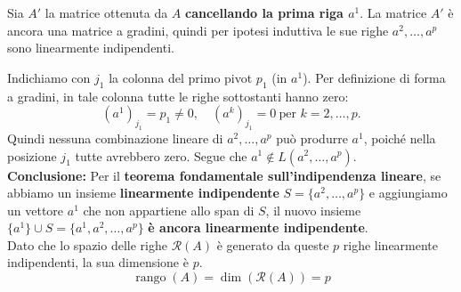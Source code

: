 {{\begin{itemize}
            Sia \(A'\) la matrice ottenuta da \(A\) \textbf{cancellando la prima riga \(a^1\)}.
            La matrice \(A'\) è ancora una matrice a gradini, quindi per ipotesi induttiva le sue righe 
            \(a^2, \dots, a^p\) sono linearmente indipendenti.
            
            Indichiamo con \(j_1\) la colonna del primo pivot \(p_1\) (in \(a^1\)).  
            Per definizione di forma a gradini, in tale colonna tutte le righe sottostanti hanno zero:
            \[
                (a^1)_{j_1} = p_1 \neq 0, 
                \quad (a^k)_{j_1} = 0 \ \text{per } k = 2, \dots, p.
            \]
            Quindi nessuna combinazione lineare di \(a^2, \dots, a^p\) può produrre \(a^1\), 
            poiché nella posizione \(j_1\) tutte avrebbero zero.  
            Segue che \(a^1 \notin L(a^2, \dots, a^p)\).\\[6pt]
            
            \textbf{Conclusione:}
            Per il \textbf{teorema fondamentale sull'indipendenza lineare}, se abbiamo un insieme \textbf{linearmente indipendente} \(S = \{a^2, \dots, a^p\}\)
            e aggiungiamo un vettore \(a^1\) che non appartiene allo span di \(S\), il nuovo insieme \(\{a^1\} \cup S = \{a^1, a^2, \dots, a^p\}\) \textbf{è ancora linearmente indipendente}.\\[4pt]
            
            Dato che lo spazio delle righe \(\mathcal{R}(A)\) è generato da queste \(p\) righe linearmente indipendenti, la sua dimensione è \(p\).
            \[
            \operatorname{rango}(A) = \dim(\mathcal{R}(A)) = p
            \]
        \end{itemize}
    }
}



